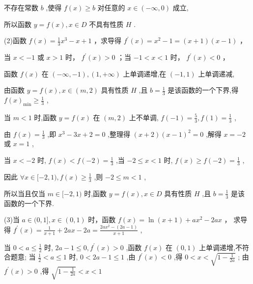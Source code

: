\documentclass[10pt]{article}
\begin{document}
不存在常数 \(b\) ,使得 \(f\left( x\right)  \geq  b\) 对任意的 \(x \in  \left( {-\infty ,0}\right)\) 成立,

所以函数 \(y = f\left( x\right) ,x \in  D\) 不具有性质 \(H\) .

(2)函数 \(f\left( x\right)  = \frac{1}{3}{x}^{3} - x + 1\) ，求导得 \({f}^{\prime }\left( x\right)  = {x}^{2} - 1 = \left( {x + 1}\right) \left( {x - 1}\right)\) ，

当 \(x <  - 1\) 或 \(x > 1\) 时， \({f}^{\prime }\left( x\right)  > 0\) ；当 \(- 1 < x < 1\) 时， \({f}^{\prime }\left( x\right)  < 0\) ，

函数 \(f\left( x\right)\) 在 \(\left( {-\infty , - 1}\right) ,\left( {1, + \infty }\right)\) 上单调递增,在 \(\left( {-1,1}\right)\) 上单调递减,

由函数 \(y = f\left( x\right) ,x \in  \left( {m,2}\right)\) 具有性质 \(H\) ,且 \(b = \frac{1}{3}\) 是该函数的一个下界,得 \(f{\left( x\right) }_{\min } \geq  \frac{1}{3}\) ,

当 \(m < 1\) 时,函数 \(y = f\left( x\right)\) 在 \(\left( {m,2}\right)\) 上不单调, \(f\left( {-1}\right)  = \frac{5}{3},f\left( 1\right)  = \frac{1}{3}\) ,

由 \(f\left( x\right)  = \frac{1}{3}\) ,即 \({x}^{3} - {3x} + 2 = 0\) ,整理得 \(\left( {x + 2}\right) {\left( x - 1\right) }^{2} = 0\) ,解得 \(x =  - 2\) 或 \(x = 1\) ,

当 \(x <  - 2\) 时, \(f\left( x\right)  < f\left( {-2}\right)  = \frac{1}{3}\) ,当 \(- 2 \leq  x < 1\) 时, \(f\left( x\right)  \geq  f\left( {-2}\right)  = \frac{1}{3}\) ,

因此 \(\forall x \in  \lbrack  - 2,1),f\left( x\right)  \geq  \frac{1}{3}\) ,则 \(- 2 \leq  m < 1\) ,

所以当且仅当 \(m \in  \lbrack  - 2,1)\) 时,函数 \(y = f\left( x\right) ,x \in  D\) 具有性质 \(H\) ,且 \(b = \frac{1}{3}\) 是该函数的一个下界.

(3)当 \(a \in  (0,1\rbrack ,x \in  \left( {0,1}\right)\) 时，函数 \(f\left( x\right)  = \ln \left( {x + 1}\right)  + a{x}^{2} - {2ax}\) ， 求导得 \({f}^{\prime }\left( x\right)  = \frac{1}{x + 1} + {2ax} - {2a} = \frac{{2a}{x}^{2} - \left( {{2a} - 1}\right) }{x + 1}\) ,

当 \(0 < a \leq  \frac{1}{2}\) 时, \({2a} - 1 \leq  0,{f}^{\prime }\left( x\right)  > 0\) ,函数 \(f\left( x\right)\) 在 \(\left( {0,1}\right)\) 上单调递增,不符合题意; 当 \(\frac{1}{2} < a \leq  1\) 时, \(0 < {2a} - 1 \leq  1\) ,由 \({f}^{\prime }\left( x\right)  < 0\) ,得 \(0 < x < \sqrt{1 - \frac{1}{2a}}\) ; 由 \({f}^{\prime }\left( x\right)  > 0\) ,得 \(\sqrt{1 - \frac{1}{2a}} < x < 1\)
\end{document}

